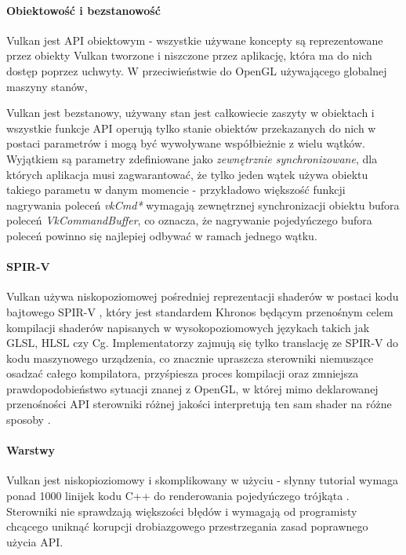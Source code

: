 \paragraph{Obiektowość i bezstanowość}

Vulkan jest API obiektowym - wszystkie używane koncepty są reprezentowane przez obiekty Vulkan tworzone i niszczone przez aplikację, która ma do nich dostęp poprzez uchwyty.
W przeciwieństwie do OpenGL używającego globalnej maszyny stanów,

Vulkan jest bezstanowy, używany stan jest całkowiecie zaszyty w obiektach i wszystkie funkcje API operują tylko stanie obiektów przekazanych do nich w postaci parametrów i mogą być wywoływane współbieżnie z wielu wątków. Wyjątkiem są parametry zdefiniowane jako \textit{zewnętrznie synchronizowane}, dla których aplikacja musi zagwarantować, że tylko jeden wątek używa obiektu takiego parametu w danym momencie - przykładowo większość funkcji nagrywania poleceń \textit{vkCmd*} wymagają zewnętrznej synchronizacji obiektu bufora poleceń \textit{VkCommandBuffer}, co oznacza, że nagrywanie pojedyńczego bufora poleceń powinno się najlepiej odbywać w ramach jednego wątku.

\paragraph{SPIR-V}

Vulkan używa niskopoziomowej pośredniej reprezentacji shaderów w postaci kodu bajtowego SPIR-V \cite{SPIRVSPEC}, który jest standardem Khronos będącym przenośnym celem kompilacji shaderów napisanych w wysokopoziomowych językach takich jak GLSL, HLSL czy Cg.
Implementatorzy zajmują się tylko translację ze SPIR-V do kodu maszynowego urządzenia, co znacznie upraszcza sterowniki niemuszące osadzać całego kompilatora, przyśpiesza proces kompilacji oraz zmniejsza prawdopodobieństwo sytuacji znanej z OpenGL, w której mimo deklarowanej przenośności API sterowniki różnej jakości interpretują ten sam shader na różne sposoby \cite{GLSLBAD}.

\paragraph{Warstwy}

Vulkan jest niskopioziomowy i skomplikowany w użyciu - słynny tutorial wymaga ponad 1000 linijek kodu C++ do renderowania pojedyńczego trójkąta  \cite{VULKANTUTORIAL}.
Sterowniki nie sprawdzają większości błędów i wymagają od programisty chcącego uniknąć korupcji drobiazgowego przestrzegania zasad poprawnego użycia API.

